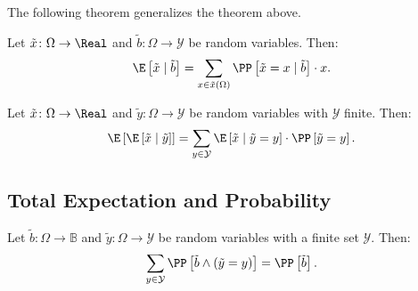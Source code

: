 The following theorem generalizes the theorem above. 
\begin{theorem}\label{thm:exp-sum-val-cnd}
Let $\tilde{x} \colon \Omega \to \Real$ and $\tilde{b} \colon \Omega \to \mathcal{Y}$ be random variables. Then:
\[
  \E \left[ \tilde{x} \mid \tilde{b} \right] 
  =
  \sum_{x\in \tilde{x}(\Omega)} \PP \left[ \tilde{x} = x \mid \tilde{b}  \right] \cdot x.
\]
\end{theorem}

\begin{theorem} \label{thm:exp-sum-val-cnd-rv}
Let $\tilde{x} \colon \Omega \to \Real$ and $\tilde{y} \colon \Omega \to \mathcal{Y}$ be random variables with $\mathcal{Y}$ finite. Then:
\[
  \E \left[ \E \left[ \tilde{x} \mid  \tilde{y} \right] \right]
  =
  \sum_{y\in \mathcal{Y}} \E \left[ \tilde{x} \mid  \tilde{y} = y \right] \cdot
                       \PP\left[ \tilde{y} = y \right].
\]
\end{theorem}


\subsection{Total Expectation and Probability}


\begin{theorem} \label{thm:total-probability}
Let $\tilde{b} \colon \Omega \to \mathbb{B}$ and $\tilde{y} \colon \Omega \to \mathcal{Y}$ be random variables with a finite set $\mathcal{Y}$. Then:
\[
\sum_{y\in \mathcal{Y}} \PP\left[\tilde{b} \wedge (\tilde{y} = y) \right] = \PP \left[ \tilde{b} \right].
\]
\end{theorem}



